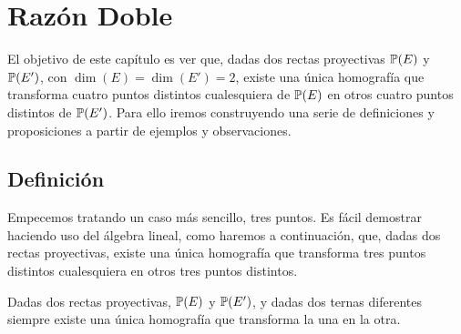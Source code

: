 \chapter{Razón Doble}
El objetivo de este capítulo es ver que, dadas dos rectas proyectivas $\mathbb{P}(E)$ y $\mathbb{P}(E')$, con $\dim(E)=\dim(E')=2$,  existe una única homografía que transforma cuatro puntos distintos cualesquiera de $\mathbb{P}(E)$ en otros cuatro puntos distintos de $\mathbb{P}(E')$. Para ello iremos construyendo una serie de definiciones y proposiciones a partir de ejemplos y observaciones.

\section{Definición}
Empecemos tratando un caso más sencillo, tres puntos. Es fácil demostrar haciendo uso del álgebra lineal, como haremos a continuación, que, dadas dos rectas proyectivas, existe una única homografía que transforma tres puntos distintos cualesquiera en otros tres puntos distintos.

\begin{prop}
	Dadas dos rectas proyectivas, $\mathbb{P}(E)$ y $\mathbb{P}(E')$, y dadas dos ternas diferentes siempre existe una única homografía que transforma la una en la otra.
\end{prop}